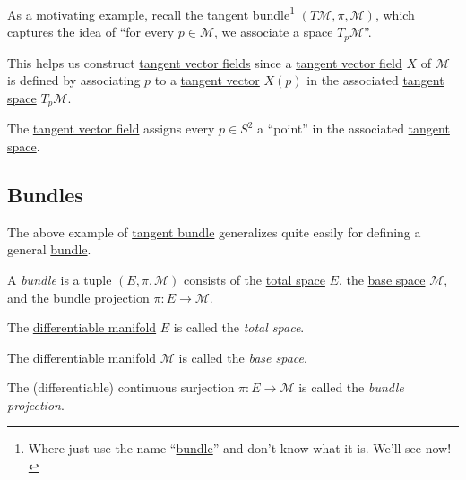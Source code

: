 As a motivating example, recall the \hyperref[def:tangent-bundle]{tangent bundle}\footnote{Where just use the name ``\hyperref[def:bundle]{bundle}'' and don't know what it is. We'll see now!} \((T\mathcal{M} , \pi , \mathcal{M} )\), which captures the idea of ``for every \(p\in \mathcal{M} \), we associate a space \(T_p \mathcal{M} \)''.

\begin{intuition}
	This helps us construct \hyperref[def:vector-field]{tangent vector fields} since a \hyperref[def:vector-field]{tangent vector field} \(X\) of \(\mathcal{M} \) is defined by associating \(p\) to a \hyperref[def:tangent-vector]{tangent vector} \(X(p)\) in the associated \hyperref[def:tangent-space]{tangent space} \(T_p \mathcal{M} \).
\end{intuition}

\begin{eg}
	The \hyperref[def:vector-field]{tangent vector field} assigns every \(p\in S^2\) a ``point'' in the associated \hyperref[def:tangent-space]{tangent space}.
	\begin{center}
	\end{center}
\end{eg}

\subsection{Bundles}
The above example of \hyperref[def:tangent-bundle]{tangent bundle} generalizes quite easily for defining a general \hyperref[def:bundle]{bundle}.

\begin{definition}[Bundle]\label{def:bundle}
	A \emph{bundle} is a tuple \((E, \pi , \mathcal{M} )\) consists of the \hyperref[def:vector-bundle-total-space]{total space} \(E\), the \hyperref[def:base-space]{base space} \(\mathcal{M} \), and the \hyperref[def:bundle-projection]{bundle projection} \(\pi \colon E \to \mathcal{M} \).
	\begin{definition}\label{def:vector-bundle-total-space}
		The \hyperref[def:smooth-manifold]{differentiable manifold} \(E\) is called the \emph{total space}.
	\end{definition}

	\begin{definition}\label{def:base-space}
		The \hyperref[def:smooth-manifold]{differentiable manifold} \(\mathcal{M} \) is called the \emph{base space}.
	\end{definition}

	\begin{definition}\label{def:bundle-projection}
		The (differentiable) continuous surjection \(\pi \colon E\to \mathcal{M} \) is called the \emph{bundle projection}.
	\end{definition}
\end{definition}


